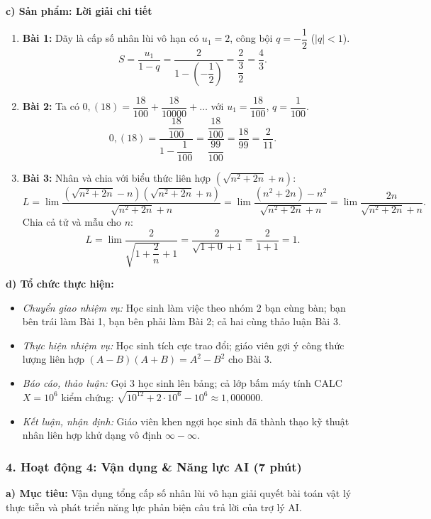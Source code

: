 \documentclass[12pt, a4paper]{article}
\begin{document}
\noindent \textbf{c) Sản phẩm: Lời giải chi tiết}
\begin{enumerate}[leftmargin=0.6cm]
    \item \textbf{Bài 1:} Dãy là cấp số nhân lùi vô hạn có $u_1 = 2$, công bội $q = -\dfrac{1}{2}$ ($|q| < 1$).
    $$S = \dfrac{u_1}{1 - q} = \dfrac{2}{1 - \left(-\dfrac{1}{2}\right)} = \dfrac{2}{\dfrac{3}{2}} = \dfrac{4}{3}.$$
    \item \textbf{Bài 2:} Ta có $0{,}(18) = \dfrac{18}{100} + \dfrac{18}{10000} + \dots$ với $u_1 = \dfrac{18}{100}$, $q = \dfrac{1}{100}$.
    $$0{,}(18) = \dfrac{\dfrac{18}{100}}{1 - \dfrac{1}{100}} = \dfrac{\dfrac{18}{100}}{\dfrac{99}{100}} = \dfrac{18}{99} = \dfrac{2}{11}.$$
    \item \textbf{Bài 3:} Nhân và chia với biểu thức liên hợp $\left(\sqrt{n^2 + 2n} + n\right)$:
    $$L = \lim \dfrac{\left(\sqrt{n^2 + 2n} - n\right)\left(\sqrt{n^2 + 2n} + n\right)}{\sqrt{n^2 + 2n} + n} = \lim \dfrac{(n^2 + 2n) - n^2}{\sqrt{n^2 + 2n} + n} = \lim \dfrac{2n}{\sqrt{n^2 + 2n} + n}.$$
    Chia cả tử và mẫu cho $n$:
    $$L = \lim \dfrac{2}{\sqrt{1 + \dfrac{2}{n}} + 1} = \dfrac{2}{\sqrt{1 + 0} + 1} = \dfrac{2}{1 + 1} = 1.$$
\end{enumerate}

\noindent \textbf{d) Tổ chức thực hiện:}
\begin{itemize}[leftmargin=0.8cm]
    \item \textit{Chuyển giao nhiệm vụ:} Học sinh làm việc theo nhóm 2 bạn cùng bàn; bạn bên trái làm Bài 1, bạn bên phải làm Bài 2; cả hai cùng thảo luận Bài 3.
    \item \textit{Thực hiện nhiệm vụ:} Học sinh tích cực trao đổi; giáo viên gợi ý công thức lượng liên hợp $(A - B)(A + B) = A^2 - B^2$ cho Bài 3.
    \item \textit{Báo cáo, thảo luận:} Gọi 3 học sinh lên bảng; cả lớp bấm máy tính CALC $X = 10^6$ kiểm chứng: $\sqrt{10^{12} + 2 \cdot 10^6} - 10^6 \approx 1{,}000000$.
    \item \textit{Kết luận, nhận định:} Giáo viên khen ngợi học sinh đã thành thạo kỹ thuật nhân liên hợp khử dạng vô định $\infty - \infty$.
\end{itemize}

\subsubsection*{4. Hoạt động 4: Vận dụng \& Năng lực AI (7 phút)}

\noindent \textbf{a) Mục tiêu:}
Vận dụng tổng cấp số nhân lùi vô hạn giải quyết bài toán vật lý thực tiễn và phát triển năng lực phản biện câu trả lời của trợ lý AI.
\end{document}
